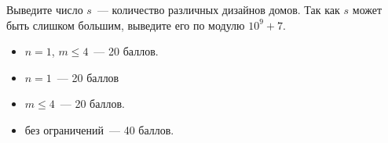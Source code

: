 \Output
Выведите число $s$~--- количество различных дизайнов домов. Так как $s$ может быть слишком большим,
выведите его по модулю $10^9 + 7$.

\Samples
\BeginTests
{}
\EndTests

\Scoring
\begin{itemize}
	\item $n = 1$, $m \le 4$~--- 20 баллов.
	\item $n = 1$~--- 20 баллов
	\item $m \le 4$~--- 20 баллов.
	\item без ограничений~--- 40 баллов.
\end{itemize}

\EndProblem
